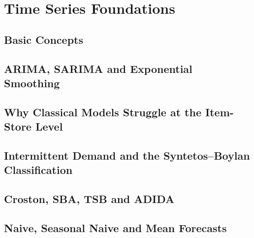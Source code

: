 \chapter{Time Series Foundations}
\label{ch:timeseries}

\section{Basic Concepts}

\section{ARIMA, SARIMA and Exponential Smoothing}

\section{Why Classical Models Struggle at the Item-Store Level}

\section{Intermittent Demand and the Syntetos--Boylan Classification}

\section{Croston, SBA, TSB and ADIDA}

\section{Naive, Seasonal Naive and Mean Forecasts}

